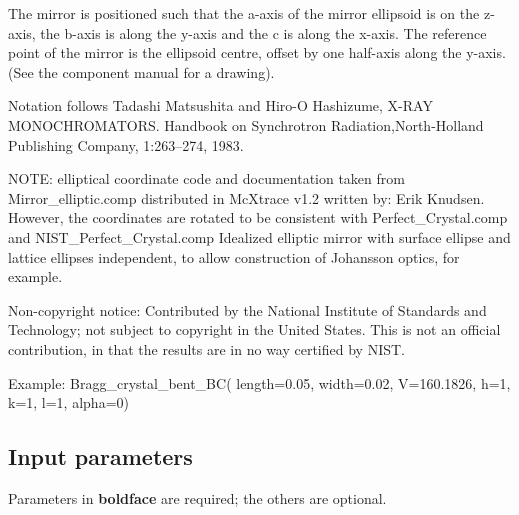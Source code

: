 The mirror is positioned such that the a-axis of the mirror ellipsoid is on the z-axis, the b-axis is along the y-axis and the c is along the x-axis. The reference point of the mirror is the ellipsoid centre, offset by one half-axis along the y-axis. (See the component manual for a drawing).

Notation follows Tadashi Matsushita and Hiro-O Hashizume, X-RAY MONOCHROMATORS. Handbook on Synchrotron Radiation,North-Holland Publishing Company, 1:263–274, 1983.

NOTE: elliptical coordinate code and documentation taken from Mirror\_elliptic.comp distributed in McXtrace v1.2 written by: Erik Knudsen. However, the coordinates are rotated to be consistent with Perfect\_Crystal.comp and NIST\_Perfect\_Crystal.comp Idealized elliptic mirror with surface ellipse and lattice ellipses independent, to allow construction of Johansson optics, for example.

Non-copyright notice: Contributed by the National Institute of Standards and Technology; not subject to copyright in the United States. This is not an official contribution, in that the results are in no way certified by NIST.

Example: Bragg\_crystal\_bent\_BC( length=0.05, width=0.02, V=160.1826, h=1, k=1, l=1, alpha=0)

\subsection*{Input parameters}
Parameters in \textbf{boldface} are required; the others are optional.

